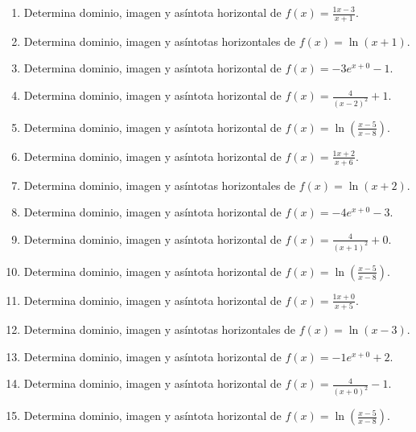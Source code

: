 \documentclass[11pt,a4paper]{article}
\begin{document}
\begin{enumerate}[label=\textbf{E\arabic*.},start=21]

\item Determina dominio, imagen y asíntota horizontal de $f(x)=\frac{1x-3}{x+1}$.

\item Determina dominio, imagen y asíntotas horizontales de $f(x)=\ln(x+1)$.

\item Determina dominio, imagen y asíntota horizontal de $f(x)=-3e^{x+0}-1$.

\item Determina dominio, imagen y asíntota horizontal de $f(x)=\frac{4}{(x-2)^2}+1$.

\item Determina dominio, imagen y asíntota horizontal de $f(x)=\ln\left(\frac{x-5}{x-8}\right)$.

\item Determina dominio, imagen y asíntota horizontal de $f(x)=\frac{1x+2}{x+6}$.

\item Determina dominio, imagen y asíntotas horizontales de $f(x)=\ln(x+2)$.

\item Determina dominio, imagen y asíntota horizontal de $f(x)=-4e^{x+0}-3$.

\item Determina dominio, imagen y asíntota horizontal de $f(x)=\frac{4}{(x+1)^2}+0$.

\item Determina dominio, imagen y asíntota horizontal de $f(x)=\ln\left(\frac{x-5}{x-8}\right)$.

\item Determina dominio, imagen y asíntota horizontal de $f(x)=\frac{1x+0}{x+5}$.

\item Determina dominio, imagen y asíntotas horizontales de $f(x)=\ln(x-3)$.

\item Determina dominio, imagen y asíntota horizontal de $f(x)=-1e^{x+0}+2$.

\item Determina dominio, imagen y asíntota horizontal de $f(x)=\frac{4}{(x+0)^2}-1$.

\item Determina dominio, imagen y asíntota horizontal de $f(x)=\ln\left(\frac{x-5}{x-8}\right)$.


\end{enumerate}
\end{document}
